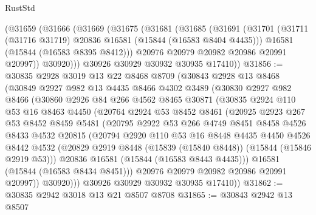 \begin{lexlean}{RustStd}
\begin{coremodule}
    (@31659
      (@31666
        (@31669
          (@31675
            (@31681
              (@31685
                (@31691
                  (@31701
                    (@31711 (@31716 @31719) @20836 @16581 (@15844 (@16583 @8404 @4435)))
                    @16581
                    (@15844 (@16583 @8395 @8412)))
                  @20976
                  @20979
                  @20982
                  @20986
                  @20991
                  @20997))
              @30920)))
        @30926
        @30929
        @30932
        @30935
        @17410))
@31856 := @30835
    @2928
    @3019
    @13
    @22
    @8468
    @8709
    (@30843
      @2928
      @13
      @8468
      (@30849
        @2927
        @982
        @13
        @4435
        @8466
        @4302
        @3489
        (@30830
          @2927
          @982
          @8466
          (@30860
            @2926
            @84
            @266
            @4562
            @8465
            @30871
            (@30835
              @2924
              @110
              @53
              @16
              @8463
              @4450
              (@20764
                @2924
                @53
                @8452
                @8461
                (@20925
                  @2923
                  @267
                  @53
                  @8452
                  @8459
                  @5481
                  (@20795
                    @2922
                    @53
                    @266
                    @4749
                    @8451
                    @8458
                    @4526
                    @8433
                    @4532
                    @20815
                    (@20794
                      @2920
                      @110
                      @53
                      @16
                      @8448
                      @4435
                      @4450
                      @4526
                      @8442
                      @4532
                      (@20829 @2919 @8448 (@15839 (@15840 @8448)) (@15844 (@15846 @2919 @53)))
                      @20836
                      @16581
                      (@15844 (@16583 @8443 @4435)))
                    @16581
                    (@15844 (@16583 @8434 @8451)))
                  @20976
                  @20979
                  @20982
                  @20986
                  @20991
                  @20997))
              @30920)))
        @30926
        @30929
        @30932
        @30935
        @17410))
@31862 := @30835 @2942 @3018 @13 @21 @8507 @8708
@31865 := @30843 @2942 @13 @8507

\end{coremodule}
\end{lexlean}
